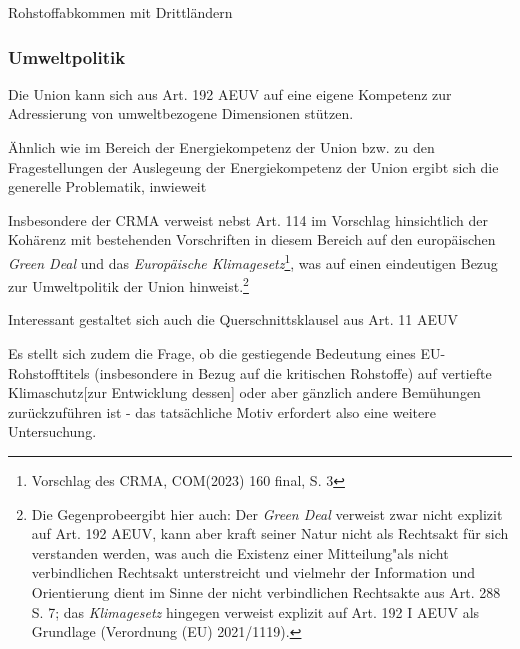 \documentclass[12pt,a4paper,oneside]{book} %
\begin{document}
	Rohstoffabkommen mit Drittländern
	
	
	\subsubsection{Umweltpolitik}
	Die Union kann sich aus Art. 192 AEUV auf eine eigene Kompetenz zur Adressierung von umweltbezogene Dimensionen stützen.
	
	Ähnlich wie im Bereich der Energiekompetenz der Union bzw. zu den Fragestellungen der Auslegeung der Energiekompetenz der Union ergibt sich die generelle Problematik, inwieweit 
	
	Insbesondere der CRMA verweist nebst Art. 114 im Vorschlag hinsichtlich der Kohärenz mit bestehenden Vorschriften in diesem Bereich auf den europäischen \textit{Green Deal} und das \textit{Europäische Klimagesetz}\footnote{Vorschlag des CRMA, COM(2023) 160 final, S. 3}, was auf einen eindeutigen Bezug zur Umweltpolitik der Union hinweist.\footnote{Die \glqq Gegenprobe\grqq ergibt hier auch: Der \textit{Green Deal} verweist zwar nicht explizit auf Art. 192 AEUV, kann aber kraft seiner Natur nicht als Rechtsakt für sich verstanden werden, was auch die Existenz einer \glqq Mitteilung"\grqq als nicht verbindlichen Rechtsakt unterstreicht und vielmehr der Information und Orientierung dient im Sinne der nicht verbindlichen Rechtsakte aus Art. 288 S. 7; das \textit{Klimagesetz} hingegen verweist explizit auf Art. 192 I AEUV als Grundlage (Verordnung (EU) 2021/1119).}
	
	Interessant gestaltet sich auch die Querschnittsklausel aus Art. 11 AEUV
	
	Es stellt sich zudem die Frage, ob die gestiegende Bedeutung eines EU-Rohstofftitels (insbesondere in Bezug auf die kritischen Rohstoffe) auf vertiefte Klimaschutz[zur Entwicklung dessen]\autocite{Gundel in Tehobald/Kühling, IV, Energieumweltrecht, Rn. 74ff.} oder aber gänzlich andere Bemühungen zurückzuführen ist - das tatsächliche Motiv erfordert also eine weitere Untersuchung.
	
\end{document}
